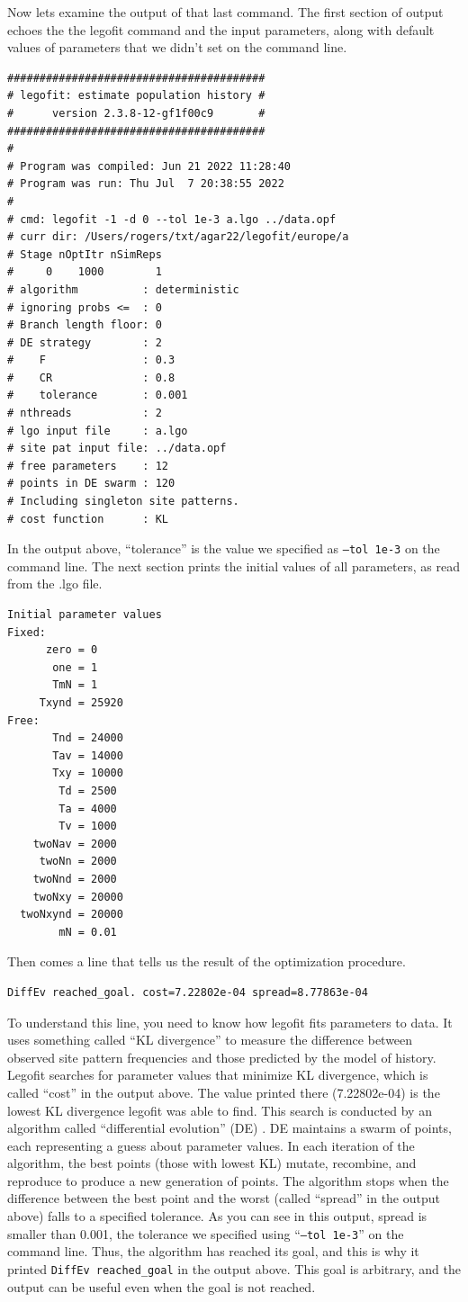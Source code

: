 \documentclass[11pt]{article}
\begin{document}
Now lets examine the output of that last command. The first section of output
echoes the the legofit command and the input parameters, along with
default values of parameters that we didn't set on the command line.
\begin{verbatim}
########################################
# legofit: estimate population history #
#      version 2.3.8-12-gf1f00c9       #
########################################
#
# Program was compiled: Jun 21 2022 11:28:40
# Program was run: Thu Jul  7 20:38:55 2022
#
# cmd: legofit -1 -d 0 --tol 1e-3 a.lgo ../data.opf
# curr dir: /Users/rogers/txt/agar22/legofit/europe/a
# Stage nOptItr nSimReps
#     0    1000        1
# algorithm          : deterministic
# ignoring probs <=  : 0
# Branch length floor: 0
# DE strategy        : 2
#    F               : 0.3
#    CR              : 0.8
#    tolerance       : 0.001
# nthreads           : 2
# lgo input file     : a.lgo
# site pat input file: ../data.opf
# free parameters    : 12
# points in DE swarm : 120
# Including singleton site patterns.
# cost function      : KL
\end{verbatim}
In the output above, ``tolerance'' is the value we specified as
\texttt{--tol 1e-3} on the command line.  The next section prints the
initial values of all parameters, as read from the .lgo file.
\begin{verbatim}
Initial parameter values
Fixed:
      zero = 0
       one = 1
       TmN = 1
     Txynd = 25920
Free:
       Tnd = 24000
       Tav = 14000
       Txy = 10000
        Td = 2500
        Ta = 4000
        Tv = 1000
    twoNav = 2000
     twoNn = 2000
    twoNnd = 2000
    twoNxy = 20000
  twoNxynd = 20000
        mN = 0.01
\end{verbatim}
Then comes a line that tells us the result of the optimization procedure.
\begin{verbatim}
DiffEv reached_goal. cost=7.22802e-04 spread=8.77863e-04
\end{verbatim}
To understand this line, you need to know how legofit fits parameters
to data. It uses something called ``KL divergence''
\citep{Kullback:AMS-22-79} to measure the difference between observed
site pattern frequencies and those predicted by the model of history.
Legofit searches for parameter values that minimize KL divergence,
which is called ``cost'' in the output above. The value printed there
(7.22802e-04) is the lowest KL divergence legofit was able to
find. This search is conducted by an algorithm called ``differential
evolution'' (DE) \citep{Price:DE-06}. DE maintains a swarm of points,
each representing a guess about parameter values.  In each iteration
of the algorithm, the best points (those with lowest KL) mutate,
recombine, and reproduce to produce a new generation of points. The
algorithm stops when the difference between the best point and the
worst (called ``spread'' in the output above) falls to a specified
tolerance. As you can see in this output, spread is smaller than
0.001, the tolerance we specified using ``\texttt{--tol 1e-3}'' on the
command line. Thus, the algorithm has reached its goal, and this is
why it printed \verb|DiffEv reached_goal| in the output above. This
goal is arbitrary, and the output can be useful even when the goal is
not reached.
\end{document}
